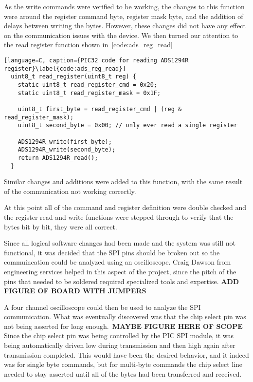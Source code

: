 As the write commands were verified to be working, the changes to this function were around the register command byte,
register mask byte, and the addition of delays between writing the bytes.
However, these changes did not have any effect on the communication issues with the device.
We then turned our attention to the read register function shown in~\autoref{code:ads_reg_read}

\begin{lstlisting}[language=C, caption={PIC32 code for reading ADS1294R register}\label{code:ads_reg_read}]
  uint8_t read_register(uint8_t reg) {
    static uint8_t read_register_cmd = 0x20;
    static uint8_t read_register_mask = 0x1F;

    uint8_t first_byte = read_register_cmd | (reg & read_register_mask);
    uint8_t second_byte = 0x00; // only ever read a single register

    ADS1294R_write(first_byte);
    ADS1294R_write(second_byte);
    return ADS1294R_read();
  }
\end{lstlisting}

Similar changes and additions were added to this function, with the same result of the communication not working correctly.

At this point all of the command and register definition were double checked and
the register read and write functions were stepped through to verify that the bytes bit by bit, they were all correct.

Since all logical software changes had been made and the system was still not functional,
it was decided that the SPI pins should be broken out so the commuincation could be analyzed using an oscilloscope.
Craig Dawson from engineering services helped in this aspect of the project,
since the pitch of the pins that needed to be soldered required specialized tools and expertise.
\textbf{ADD FIGURE OF BOARD WITH JUMPERS}

A four channel oscilloscope could then be used to analyze the SPI communication.
What was eventually discovered was that the chip select pin was not being asserted for long enough.~\textbf{MAYBE FIGURE HERE OF SCOPE}
Since the chip select pin was being controlled by the PIC SPI module,
it was being automatically driven low during transmission and then high again after transmission completed.
This would have been the desired behavior, and it indeed was for single byte commands,
but for multi-byte commands the chip select line needed to stay asserted until all of the bytes had been transferred and received.

